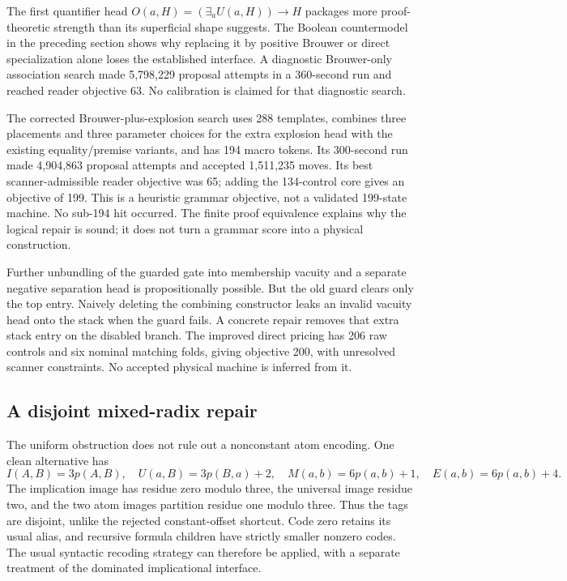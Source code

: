 \documentclass[11pt,letterpaper]{article}
\begin{document}
The first quantifier head
$O(a,H)=(\exists_a U(a,H))\to H$ packages more proof-theoretic strength
than its superficial shape suggests. The Boolean countermodel in the
preceding section shows why replacing it by positive Brouwer or direct
specialization alone loses the established interface. A diagnostic
Brouwer-only association search made 5,798,229 proposal attempts in a
360-second run and reached reader objective 63. No calibration is claimed
for that diagnostic search.

The corrected Brouwer-plus-explosion search uses 288 templates, combines
three placements and three parameter choices for the extra explosion
head with the existing equality/premise variants, and has 194 macro tokens.
Its 300-second run made 4,904,863 proposal attempts and accepted 1,511,235
moves. Its best scanner-admissible reader objective was 65; adding the
134-control core gives an objective of 199. This is a heuristic grammar
objective, not a validated 199-state machine. No sub-194 hit occurred.
The finite proof equivalence explains why the logical repair is sound;
it does not turn a grammar score into a physical construction.

Further unbundling of the guarded gate into membership vacuity and a
separate negative separation head is propositionally possible. But the
old guard clears only the top entry. Naively deleting the combining
constructor leaks an invalid vacuity head onto the stack when the guard
fails. A concrete repair removes that extra stack entry on the disabled
branch. The improved direct pricing has 206 raw controls and six nominal
matching folds, giving objective 200, with unresolved scanner constraints.
No accepted physical machine is inferred from it.

\subsection{A disjoint mixed-radix repair}

The uniform obstruction does not rule out a nonconstant atom encoding.
One clean alternative has
\[
 I(A,B)=3p(A,B),\quad U(a,B)=3p(B,a)+2,
 \quad M(a,b)=6p(a,b)+1,\quad E(a,b)=6p(a,b)+4.
 \tag{4}
\]
The implication image has residue zero modulo three, the universal image
residue two, and the two atom images partition residue one modulo three.
Thus the tags are disjoint, unlike the rejected constant-offset shortcut.
Code zero retains its usual alias, and recursive formula children have
strictly smaller nonzero codes. The usual syntactic recoding strategy can
therefore be applied, with a separate treatment of the dominated
implicational interface.
\end{document}
